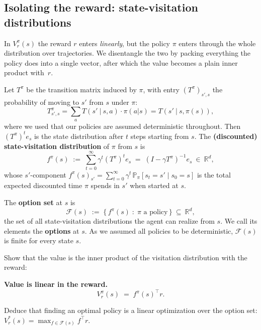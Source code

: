 \documentclass[11pt]{article}
\newcommand{\R}{\mathbb{R}}
\newcommand{\Prob}{\mathbb{P}}
\newcommand{\F}{\mathcal{F}}       %
\begin{document}
\subsection*{Isolating the reward: state-visitation distributions}

In $V^\pi_r(s)$ the reward $r$ enters \emph{linearly}, but the policy $\pi$ enters through
the whole distribution over trajectories. We disentangle the two by packing everything the
policy does into a single vector, after which the value becomes a plain inner product
with~$r$.

\begin{definition}\label{def:visit}
Let $T^\pi$ be the transition matrix induced by $\pi$, with entry $(T^\pi)_{s',s}$ the
probability of moving to $s'$ from $s$ under $\pi$:
$$T^{\pi}_{s',s} = \sum_{a} T(s' \ | \ s, a) \cdot \pi(a | s) = T(s' \ | \ s, \pi(s)),$$
where we used that our policies are assumed deterministic throughout.
Then $(T^\pi)^t e_s$ is the state
distribution after $t$ steps starting from $s$. The \textbf{(discounted) state-visitation
distribution} of $\pi$ from $s$ is
$$
f^\pi(s) \;:=\; \sum_{t=0}^{\infty} \gamma^t (T^\pi)^t e_s \;=\; (I - \gamma T^\pi)^{-1} e_s \ \in\ \R^d,
$$
whose $s'$-component
$f^\pi(s)_{s'} = \sum_{t=0}^\infty \gamma^t\, \Prob_\pi[s_t = s' \mid s_0 = s]$ is the total
expected discounted time $\pi$ spends in $s'$ when started at $s$.
\end{definition}

\begin{definition}\label{def:options}
The \textbf{option set} at $s$ is
$$
\F(s) \;:=\; \bigl\{\, f^\pi(s) \;:\; \pi \text{ a policy}\,\bigr\} \ \subseteq\ \R^d,
$$
the set of all state-visitation distributions the agent can realize from $s$. We call its
elements the \textbf{options} at $s$.
As we assumed all policies to be deterministic, $\F(s)$ is finite for every state $s$.
\end{definition}



\begin{exercise}
\label{prob:value_linear} Show that the value is the inner product of the
visitation distribution with the reward:
\begin{callout}
\textbf{Value is linear in the reward.}
$$
V^\pi_r(s) \;=\; f^\pi(s)^\top r.
$$
\end{callout}
Deduce that finding an optimal policy is a linear optimization over the option set:
$V^\ast_r(s) = \max_{f \in \F(s)} f^\top r$.
\end{exercise}
\end{document}
